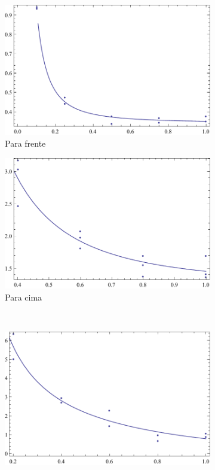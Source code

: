 \documentclass[]{beamer}
\begin{document}
\begin{frame}
\begin{figure}
\begin{subfigure}[b]{0.4\textwidth}
	\centering
	\includegraphics[width=\textwidth]{images/regressionForward.pdf}
	\caption{Para frente}
\end{subfigure}
\begin{subfigure}[b]{0.4\textwidth}
	\centering
	\includegraphics[width=\textwidth]{images/regressionUp.pdf}
	\caption{Para cima}
\end{subfigure}\\
\begin{subfigure}[b]{0.4\textwidth}
	\centering
	\includegraphics[width=\textwidth]{images/regressionDown.pdf}

\end{subfigure}
\end{figure}
\end{frame}
\end{document}
